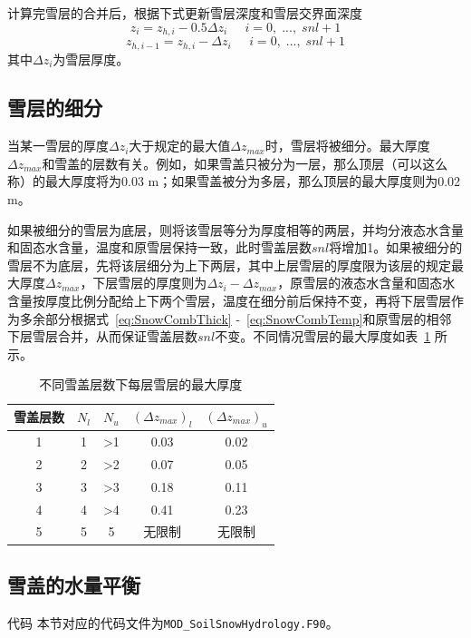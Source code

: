 计算完雪层的合并后，根据下式更新雪层深度和雪层交界面深度
\begin{equation}
    z_i=z_{h,i}-0.5\Delta z_i \;\;\;\;\;i=0,\;...,\;snl+1
\end{equation}
\begin{equation}
    z_{h,i-1}=z_{h,i}-\Delta z_i \;\;\;\;\;i=0,\;...,\;snl+1
\end{equation}
其中$\Delta z_i$为雪层厚度。



\subsection{雪层的细分}
当某一雪层的厚度$\Delta z_i$大于规定的最大值$\Delta z_{max}$时，雪层将被细分。最大厚度$\Delta z_{max}$和雪盖的层数有关。例如，如果雪盖只被分为一层，那么顶层（可以这么称）的最大厚度将为0.03 \unit{m}；如果雪盖被分为多层，那么顶层的最大厚度则为0.02 \unit{m}。

如果被细分的雪层为底层，则将该雪层等分为厚度相等的两层，并均分液态水含量和固态水含量，温度和原雪层保持一致，此时雪盖层数$snl$将增加1。如果被细分的雪层不为底层，先将该层细分为上下两层，其中上层雪层的厚度限为该层的规定最大厚度$\Delta z_{max}$，下层雪层的厚度则为$\Delta z_i - \Delta z_{max}$，原雪层的液态水含量和固态水含量按厚度比例分配给上下两个雪层，温度在细分前后保持不变，再将下层雪层作为多余部分根据式~\eqref{eq:SnowCombThick} -~\eqref{eq:SnowCombTemp}和原雪层的相邻下层雪层合并，从而保证雪盖层数$snl$不变。不同情况雪层的最大厚度如表~\ref{lab:雪层最大厚度} 所示。

\begin{table}[!ht]
    \centering
    \caption{不同雪盖层数下每层雪层的最大厚度}
    \label{lab:雪层最大厚度}
    \begin{tabular}{c|c|c|c|c}
    \toprule
        雪盖层数 & $N_{l}$ & $N_{u}$ & $(\Delta z_{max})_{l}$ & $(\Delta z_{max})_{u}$ \\ \midrule
        1 & 1 & >1 & 0.03 & 0.02 \\
        2 & 2 & >2 & 0.07 & 0.05 \\
        3 & 3 & >3 & 0.18 & 0.11 \\
        4 & 4 & >4 & 0.41 & 0.23 \\
        5 & 5 & 5 & 无限制 & 无限制 \\ \bottomrule
    \end{tabular}
\end{table}


\subsection{雪盖的水量平衡}
\begin{mymdframed}{代码}
本节对应的代码文件为\texttt{MOD\_SoilSnowHydrology.F90}。
\end{mymdframed}

